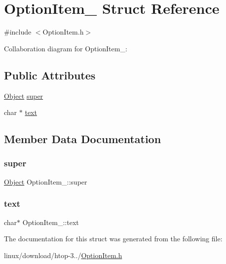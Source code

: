 \hypertarget{structOptionItem__}{}\section{Option\+Item\+\_\+ Struct Reference}
\label{structOptionItem__}


{\ttfamily \#include $<$Option\+Item.\+h$>$}



Collaboration diagram for Option\+Item\+\_\+\+:
\subsection*{Public Attributes}
\begin{DoxyCompactItemize}
\item 
\hyperlink{Object_8h_a32b67ad7134cd31b5ec5ed9c6a2d3978}{Object} \hyperlink{structOptionItem___a69c31adfd0b43794515eff56f0b00fc2}{super}
\item 
char $\ast$ \hyperlink{structOptionItem___aacf0ea1422db40ad415d690732bbb186}{text}
\end{DoxyCompactItemize}


\subsection{Member Data Documentation}
\mbox{\label{structOptionItem___a69c31adfd0b43794515eff56f0b00fc2}} 
\subsubsection{\texorpdfstring{super}{super}}
{\footnotesize\ttfamily \hyperlink{Object_8h_a32b67ad7134cd31b5ec5ed9c6a2d3978}{Object} Option\+Item\+\_\+\+::super}

\mbox{\label{structOptionItem___aacf0ea1422db40ad415d690732bbb186}} 
\subsubsection{\texorpdfstring{text}{text}}
{\footnotesize\ttfamily char$\ast$ Option\+Item\+\_\+\+::text}



The documentation for this struct was generated from the following file\+:\begin{DoxyCompactItemize}
\item 
linux/download/htop-\/3../\hyperlink{OptionItem_8h}{Option\+Item.\+h}\end{DoxyCompactItemize}
